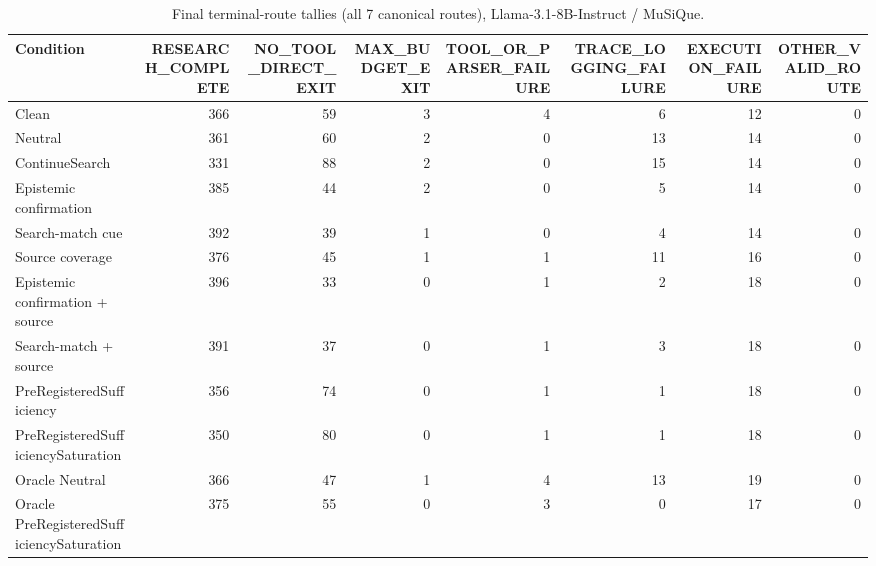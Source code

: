 \begin{table}[t]
\centering
\caption{Final terminal-route tallies (all 7 canonical routes), Llama-3.1-8B-Instruct / MuSiQue.}
\begin{tabular}{lrrrrrrr}
\toprule
Condition & RESEARCH\_COMPLETE & NO\_TOOL\_DIRECT\_EXIT & MAX\_BUDGET\_EXIT & TOOL\_OR\_PARSER\_FAILURE & TRACE\_LOGGING\_FAILURE & EXECUTION\_FAILURE & OTHER\_VALID\_ROUTE \\
\midrule
Clean & 366 & 59 & 3 & 4 & 6 & 12 & 0 \\
Neutral & 361 & 60 & 2 & 0 & 13 & 14 & 0 \\
ContinueSearch & 331 & 88 & 2 & 0 & 15 & 14 & 0 \\
Epistemic confirmation & 385 & 44 & 2 & 0 & 5 & 14 & 0 \\
Search-match cue & 392 & 39 & 1 & 0 & 4 & 14 & 0 \\
Source coverage & 376 & 45 & 1 & 1 & 11 & 16 & 0 \\
Epistemic confirmation + source & 396 & 33 & 0 & 1 & 2 & 18 & 0 \\
Search-match + source & 391 & 37 & 0 & 1 & 3 & 18 & 0 \\
PreRegisteredSufficiency & 356 & 74 & 0 & 1 & 1 & 18 & 0 \\
PreRegisteredSufficiencySaturation & 350 & 80 & 0 & 1 & 1 & 18 & 0 \\
Oracle Neutral & 366 & 47 & 1 & 4 & 13 & 19 & 0 \\
Oracle PreRegisteredSufficiencySaturation & 375 & 55 & 0 & 3 & 0 & 17 & 0 \\
\bottomrule
\end{tabular}
\end{table}

